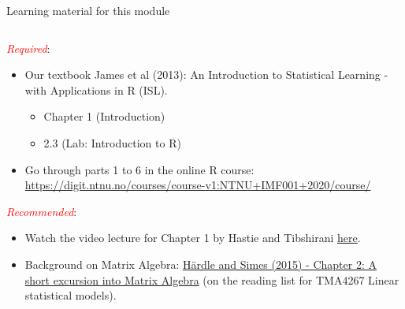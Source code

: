 \documentclass[10pt,ignorenonframetext,]{beamer}
\providecommand{\tightlist}{%
  \setlength{\itemsep}{0pt}\setlength{\parskip}{0pt}}
\begin{document}
\begin{frame}

\begin{block}{Learning material for this module}

\(~\)

\emph{\textcolor{red}{Required}}:

\vspace{1mm}

\begin{itemize}
\tightlist
\item
  Our textbook James et al (2013): An Introduction to Statistical
  Learning - with Applications in R (ISL).

  \begin{itemize}
  \tightlist
  \item
    Chapter 1 (Introduction)
  \item
    2.3 (Lab: Introduction to R)
  \end{itemize}
\end{itemize}

\vspace{2mm}

\begin{itemize}
\tightlist
\item
  Go through parts 1 to 6 in the online R course:
  \url{https://digit.ntnu.no/courses/course-v1:NTNU+IMF001+2020/course/}
\end{itemize}

\vspace{3mm}

\emph{\textcolor{red}{Recommended}}:

\vspace{1mm}

\begin{itemize}
\item
  Watch the video lecture for Chapter 1 by Hastie and Tibshirani
  \href{https://www.r-bloggers.com/in-depth-introduction-to-machine-learning-in-15-hours-of-expert-videos/}{here}.
\item
  Background on Matrix Algebra:
  \href{https://link.springer.com/chapter/10.1007/978-3-662-45171-7_2}{Härdle
  and Simes (2015) - Chapter 2: A short excursion into Matrix Algebra}
  (on the reading list for TMA4267 Linear statistical models).
\end{itemize}

\end{block}

\end{frame}
\end{document}
